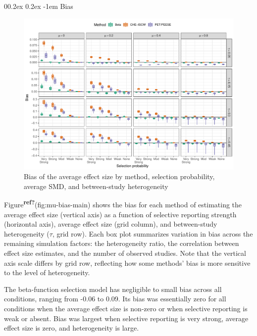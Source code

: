 \documentclass[
  american,
  man, donotrepeattitle,floatsintext]{apa7}
\makeatletter
\let\oldparagraph\paragraph
\renewcommand{\paragraph}{
    \@ifstar
      \xxxParagraphStar
      \xxxParagraphNoStar
  }
\newcommand{\xxxParagraphStar}[1]{\oldparagraph*{#1}\mbox{}}
\newcommand{\xxxParagraphNoStar}[1]{\oldparagraph{#1}\mbox{}}
\renewcommand{\paragraph}{\@startsection{paragraph}{4}{\parindent}%
  {0\baselineskip \@plus 0.2ex \@minus 0.2ex}%
  {-1em}%
  {\normalfont\normalsize\bfseries\itshape\typesectitle}}
\makeatother
\begin{document}
\paragraph{Bias}\label{bias}

\begin{figure}
\includegraphics{beta-function-selection-models-with-dependent-effects_files/figure-latex/mu-bias-main-1} \caption{Bias of the average effect size by method, selection probability, average SMD, and between-study heterogeneity}\label{fig:mu-bias-main}
\end{figure}

Figure\textsuperscript{\textbf{ref?}}(fig:mu-bias-main) shows the bias for each method of estimating the average effect size (vertical axis) as a function of selective reporting strength (horizontal axis), average effect size (grid column), and between-study heterogeneity (\(\tau\), grid row). Each box plot summarizes variation in bias across the remaining simulation factors: the heterogeneity ratio, the correlation between effect size estimates, and the number of observed studies. Note that the vertical axis scale differs by grid row, reflecting how some methods' bias is more sensitive to the level of heterogeneity.

The beta-function selection model has negligible to small bias across all conditions, ranging from -0.06 to 0.09. Its bias was essentially zero for all conditions when the average effect size is non-zero or when selective reporting is weak or absent. Bias was largest when selective reporting is very strong, average effect size is zero, and heterogeneity is large.
\end{document}
